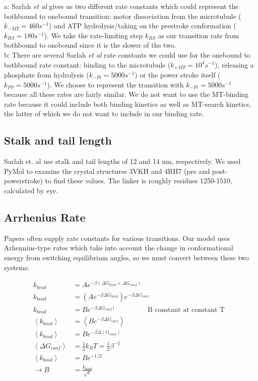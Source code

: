 \documentclass[10pt]{article} %
\begin{document}
a: Sarlah \textit{et al} gives us two different rate constants which could represent the bothbound to onebound transition: motor dissociation from the microtubule ($k_{-MT} = 460 s^{-1}$) and ATP hydrolysis/taking on the prestroke conformation ($k_{RS} = 180 s^{-1}$). We take the rate-limiting step $k_{RS}$ as our transition rate from bothbound to onebound since it is the slower of the two.\\

b: There are several Sarlah \textit{et al} rate constants we could use for the onebound to bothbound rate constant: binding to the microtubule ($k_{+MT} = 10^4 s^{-1}$), releasing a phosphate from hydrolysis ($k_{-Pi} = 5000 s^{-1}$) or the power stroke itself ($k_{PS} = 5000 s^{-1}$). We choose to represent the transition with $k_{-Pi} = 5000 s^{-1}$ because all these rates are fairly similar. We do not want to use the MT-binding rate because it could include both binding kinetics as well as MT-search kinetics, the latter of which we do not want to include in our binding rate.\\

\subsection{Stalk and tail length}
Sarlah et. al use stalk and tail lengths of 12 and 14 nm, respectively. We used PyMol to examine the crystal structures 3VKH and 4RH7 (pre and post-powerstroke) to find these values. The linker is roughly residues 1250-1510, calculated by eye.\\

\subsection{Arrhenius Rate}
Papers often supply rate constants for various transitions. Our model uses Arhennius-type rates which take into account the change in conformational energy from switching equilibrium angles, so we must
convert between these two systems:

\begin{align*}
  k_{bind} &= Ae^{-\beta(\Delta G_{bind} + \Delta G_{conf})}\\
  k_{bind} &= \left(Ae^{-\beta\Delta G_{bind}}\right)e^{-\beta\Delta G_{conf}}\\
  k_{bind} &= Be^{-\beta\Delta G_{conf})}\hspace{2cm}\mbox{B constant at constant T}\\
  \left<k_{bind}\right> &= \left<Be^{-\beta\Delta G_{conf}}\right>\\
  \left<k_{bind}\right> &= Be^{-\beta\Delta \left<G_{conf}\right>}\\
  \left<\Delta G_{conf}\right> &= \frac{1}{2}k_BT = \frac12\beta^{-1}\\
  \left<k_{bind}\right> &= Be^{-1/2}\\
  \rightarrow B &= \frac{k_{bind}}{\sqrt{e}}
\end{align*}
\end{document}
